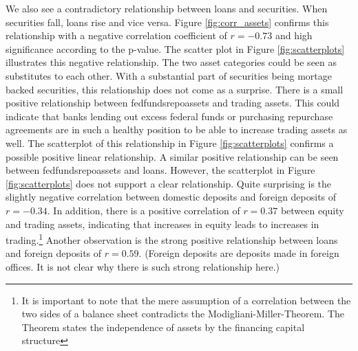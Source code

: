\documentclass[12pt, a4paper]{article} %
\begin{document}
We also see a contradictory relationship between loans and securities. When securities fall, loans rise and vice versa. Figure \ref{fig:corr_assets} confirms this relationship with a negative correlation coefficient of $r=-0.73$ and high significance according to the p-value. The scatter plot in Figure \ref{fig:scatterplots} illustrates this negative relationship. The two asset categories could be seen as substitutes to each other. With a substantial part of securities being mortage backed securities, this relationship does not come as a surprise. 
There is a small positive relationship between fedfundsrepoassets and trading assets. This could indicate that banks lending out excess federal funds or purchasing repurchase agreements are in such a healthy position to be able to increase trading assets as well. The scatterplot of this relationship in Figure \ref{fig:scatterplots} confirms a possible positive linear relationship. A similar positive relationship can be seen between fedfundsrepoassets and loans. However, the scatterplot in Figure \ref{fig:scatterplots} does not support a clear relationship.
Quite surprising is the slightly negative correlation between domestic deposits and foreign deposits of $r=-0.34$.
In addition, there is a positive correlation of $r=0.37$ between equity and trading assets, indicating that increases in equity leads to increases in trading.\footnote{It is important to note that the mere assumption of a correlation between the two sides of a balance sheet contradicts the Modigliani-Miller-Theorem. The Theorem states the independence of assets by the financing capital structure}
Another observation is the strong positive relationship between loans and foreign deposits of $r=0.59$. (Foreign deposits are deposits made in foreign offices. It is not clear why there is such strong relationship here.)
\end{document}
